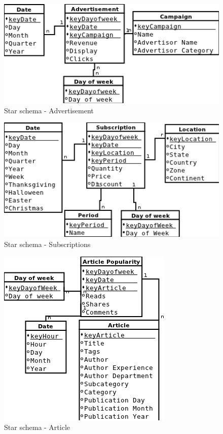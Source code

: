 
\begin{figure}[!hbp]
\begin{center}
    \includegraphics[scale=0.5]{schema_star_advertisement}
\caption{\label{pic:st_adv} Star schema - Advertisement}
\end{center}
\end{figure}

\begin{figure}[!hbp]
\begin{center}
    \includegraphics[scale=0.5]{schema_star_subscriptions}
\caption{\label{pic:st_sub}  Star schema - Subscriptions}
\end{center}
\end{figure}

\begin{figure}[!hbp]
\begin{center}
    \includegraphics[scale=0.5]{schema_star_article}
\caption{\label{pic:st_art}  Star schema - Article}
\end{center}
\end{figure}

